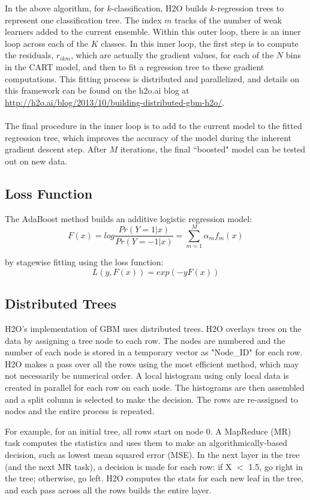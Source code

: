 {In the above algorithm, for $k$-classification, H2O builds $k$-regression trees to represent one classification tree. The index $m$ tracks of the number of weak learners added to the current ensemble. Within this outer loop, there is an inner loop across each of the $K$ classes. In this inner loop, the first step is to compute the residuals, $r_{ikm}$, which are actually the gradient values, for each of the $N$ bins in the CART model, and then to fit a regression tree to these gradient computations. This fitting process is distributed and parallelized, and details on this framework can be found on the h2o.ai blog at {\url{http://h2o.ai/blog/2013/10/building-distributed-gbm-h2o/}}.
\\
\\
The final procedure in the inner loop is to add to the current model to the fitted regression tree, which improves the accuracy of the model during the inherent gradient descent step. After $M$ iterations, the final ``boosted" model can be tested out on new data.

\subsection{Loss Function}
The AdaBoost method builds an additive logistic regression model:
$${F(x) = log}\frac{Pr(Y = 1|x)}{Pr(Y = -1|x)} = \sum_{m=1}^{M} \alpha_m f_m (x) $$

by stagewise fitting using the loss function: 
$$L(y, F(x)) = exp(-y  F (x)) $$



\subsection{Distributed Trees}

H2O's implementation of GBM uses distributed trees. H2O overlays trees on the data by assigning a tree node to each row. The nodes are numbered and the number of each node is stored in a temporary vector as "Node\_ID" for each row. H2O makes a pass over all the rows using the most efficient method, which may not necessarily be  numerical order. A local histogram using only local data is created in parallel for each row on each node. The histograms are then assembled and a split column is selected to make the decision. The rows are re-assigned to nodes and the entire process is repeated. 

For example, for an initial tree, all rows start on node 0. A MapReduce (MR) task computes the statistics and uses them to make an algorithmically-based decision, such as lowest mean squared error (MSE). In the next layer in the tree (and the next MR task), a decision is made for each row: if X $<$ 1.5, go right in the tree; otherwise, go left. H2O computes the stats for each new leaf in the tree, and each pass across all the rows builds the entire layer. 

}
